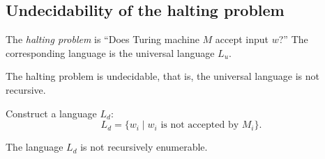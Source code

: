 \begin{page}
\setcounter{section}{8}
\setcounter{subsection}{5}
\setcounter{dfn}{7}
\label{portion:1353}

\subsection{Undecidability of the halting problem}
The \emph{halting problem} is ``Does Turing machine $M$ accept input $w$?''
The corresponding language is the universal language $L_u$.


\end{page}

\begin{page}
\setcounter{section}{8}
\setcounter{subsection}{5}
\setcounter{dfn}{8}
\label{portion:1355}

\begin{thm}
\label{thm:HaltingProblem}
The halting problem is undecidable, that is, the universal language is not recursive.
\end{thm}

\end{page}

\begin{page}
\setcounter{section}{8}
\setcounter{subsection}{5}
\setcounter{dfn}{8}
\label{portion:1356}


Construct a language $L_d$:
\[
L_d = \{w_i \mid w_i \text{ is not accepted by }M_i\}.
\]


\end{page}

\begin{page}
\setcounter{section}{8}
\setcounter{subsection}{5}
\setcounter{dfn}{9}
\label{portion:1358}

\begin{lem}
\label{lem:LdNotRE}
The language $L_d$ is not recursively enumerable.
\end{lem}

\end{page}

